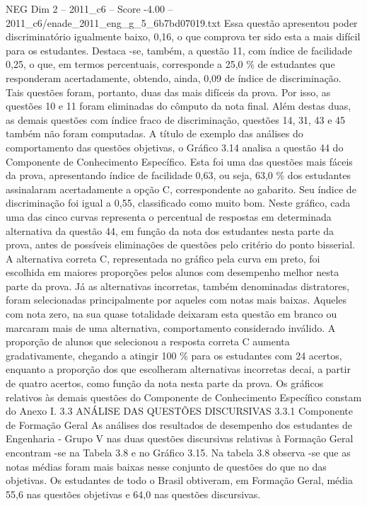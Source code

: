 \begin{textsample}{NEG Dim 2 – 2011\_c6 – Score -4.00 – 2011\_c6/enade\_2011\_eng\_g\_5\_6b7bd07019.txt}
Essa questão apresentou poder discriminatório igualmente baixo, 0,16, o que comprova ter sido esta a mais difícil para os estudantes.
Destaca -se, também, a questão 11, com índice de facilidade 0,25, o que, em termos percentuais, corresponde a 25,0 \% de estudantes que responderam acertadamente, obtendo, ainda, 0,09 de índice de discriminação.
Tais questões foram, portanto, duas das mais difíceis da prova.
Por isso, as questões 10 e 11 foram eliminadas do cômputo da nota final.
Além destas duas, as demais questões com índice fraco de discriminação, questões 14, 31, 43 e 45 também não foram computadas.
A título de exemplo das análises do comportamento das questões objetivas, o Gráfico 3.14 analisa a questão 44 do Componente de Conhecimento Específico.
Esta foi uma das questões mais fáceis da prova, apresentando índice de facilidade 0,63, ou seja, 63,0 \% dos estudantes assinalaram acertadamente a opção C, correspondente ao gabarito.
Seu índice de discriminação foi igual a 0,55, classificado como muito bom.
Neste gráfico, cada uma das cinco curvas representa o percentual de respostas em determinada alternativa da questão 44, em função da nota dos estudantes nesta parte da prova, antes de possíveis eliminações de questões pelo critério do ponto bisserial.
A alternativa correta C, representada no gráfico pela curva em preto, foi escolhida em maiores proporções pelos alunos com desempenho melhor nesta parte da prova.
Já as alternativas incorretas, também denominadas distratores, foram selecionadas principalmente por aqueles com notas mais baixas.
Aqueles com nota zero, na sua quase totalidade deixaram esta questão em branco ou marcaram mais de uma alternativa, comportamento considerado inválido.
A proporção de alunos que selecionou a resposta correta C aumenta gradativamente, chegando a atingir 100 \% para os estudantes com 24 acertos, enquanto a proporção dos que escolheram alternativas incorretas decai, a partir de quatro acertos, como função da nota nesta parte da prova.
Os gráficos relativos às demais questões do Componente de Conhecimento Específico constam do Anexo I. 3.3 ANÁLISE DAS QUESTÕES DISCURSIVAS 3.3.1 Componente de Formação Geral As análises dos resultados de desempenho dos estudantes de Engenharia - Grupo V nas duas questões discursivas relativas à Formação Geral encontram -se na Tabela 3.8 e no Gráfico 3.15.
Na tabela 3.8 observa -se que as notas médias foram mais baixas nesse conjunto de questões do que no das objetivas.
Os estudantes de todo o Brasil obtiveram, em Formação Geral, média 55,6 nas questões objetivas e 64,0 nas questões discursivas.

\end{textsample}
